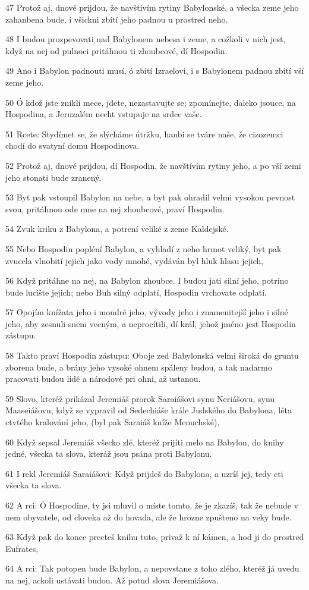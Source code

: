 \par 47 Protož aj, dnové prijdou, že navštívím rytiny Babylonské, a všecka zeme jeho zahanbena bude, i všickni zbití jeho padnou u prostred neho.
\par 48 I budou prozpevovati nad Babylonem nebesa i zeme, a cožkoli v nich jest, když na nej od pulnoci pritáhnou ti zhoubcové, dí Hospodin.
\par 49 Ano i Babylon padnouti musí, ó zbití Izraelovi, i s Babylonem padnou zbití vší zeme jeho.
\par 50 Ó kdož jste znikli mece, jdete, nezastavujte se; zpomínejte, daleko jsouce, na Hospodina, a Jeruzalém necht vstupuje na srdce vaše.
\par 51 Rcete: Stydímet se, že slýcháme útržku, hanbí se tváre naše, že cizozemci chodí do svatyní domu Hospodinova.
\par 52 Protož aj, dnové prijdou, dí Hospodin, že navštívím rytiny jeho, a po vší zemi jeho stonati bude zranený.
\par 53 Byt pak vstoupil Babylon na nebe, a byt pak ohradil velmi vysokou pevnost svou, pritáhnou ode mne na nej zhoubcové, praví Hospodin.
\par 54 Zvuk kriku z Babylona, a potrení veliké z zeme Kaldejské.
\par 55 Nebo Hospodin popléní Babylon, a vyhladí z neho hrmot veliký, byt pak zvucela vlnobití jejich jako vody mnohé, vydáván byl hluk hlasu jejich,
\par 56 Když pritáhne na nej, na Babylon zhoubce. I budou jati silní jeho, potríno bude lucište jejich; nebo Buh silný odplatí, Hospodin vrchovate odplatí.
\par 57 Opojím knížata jeho i moudré jeho, vývody jeho i znamenitejší jeho i silné jeho, aby zesnuli snem vecným, a neprocítili, dí král, jehož jméno jest Hospodin zástupu.
\par 58 Takto praví Hospodin zástupu: Oboje zed Babylonská velmi široká do gruntu zborena bude, a brány jeho vysoké ohnem spáleny budou, a tak nadarmo pracovati budou lidé a národové pri ohni, až ustanou.
\par 59 Slovo, kteréž prikázal Jeremiáš prorok Saraiášovi synu Neriášovu, synu Maaseiášovu, když se vypravil od Sedechiáše krále Judského do Babylona, léta ctvtého kralování jeho, (byl pak Saraiáš kníže Menuchské),
\par 60 Když sepsal Jeremiáš všecko zlé, kteréž prijíti melo na Babylon, do knihy jedné, všecka ta slova, kteráž jsou psána proti Babylonu.
\par 61 I rekl Jeremiáš Saraiášovi: Když prijdeš do Babylona, a uzríš jej, tedy cti všecka ta slova.
\par 62 A rci: Ó Hospodine, ty jsi mluvil o míste tomto, že je zkazíš, tak že nebude v nem obyvatele, od cloveka až do hovada, ale že hrozne zpušteno na veky bude.
\par 63 Když pak do konce precteš knihu tuto, privaž k ní kámen, a hod ji do prostred Eufrates,
\par 64 A rci: Tak potopen bude Babylon, a nepovstane z toho zlého, kteréž já uvedu na nej, ackoli ustávati budou. Až potud slova Jeremiášova.

